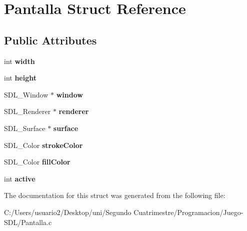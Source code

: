 \hypertarget{struct_pantalla}{}\section{Pantalla Struct Reference}
\label{struct_pantalla}
\subsection*{Public Attributes}
\begin{DoxyCompactItemize}
\item 
int {\bfseries width}\hypertarget{struct_pantalla_a0e9fa97feaefd883cbd532f737d9554e}{}\label{struct_pantalla_a0e9fa97feaefd883cbd532f737d9554e}

\item 
int {\bfseries height}\hypertarget{struct_pantalla_ae15fda85fd6288ea074a7a1b300fd58a}{}\label{struct_pantalla_ae15fda85fd6288ea074a7a1b300fd58a}

\item 
S\+D\+L\+\_\+\+Window $\ast$ {\bfseries window}\hypertarget{struct_pantalla_a8dec9e2d342435a93855aeb511ccd862}{}\label{struct_pantalla_a8dec9e2d342435a93855aeb511ccd862}

\item 
S\+D\+L\+\_\+\+Renderer $\ast$ {\bfseries renderer}\hypertarget{struct_pantalla_aef7ea33823f4c47b5375139c124a8029}{}\label{struct_pantalla_aef7ea33823f4c47b5375139c124a8029}

\item 
S\+D\+L\+\_\+\+Surface $\ast$ {\bfseries surface}\hypertarget{struct_pantalla_a285cfe423fdb8f711ff813b909e0e52e}{}\label{struct_pantalla_a285cfe423fdb8f711ff813b909e0e52e}

\item 
S\+D\+L\+\_\+\+Color {\bfseries stroke\+Color}\hypertarget{struct_pantalla_abd2fd66b3aba1f8ade0bc7f132b63038}{}\label{struct_pantalla_abd2fd66b3aba1f8ade0bc7f132b63038}

\item 
S\+D\+L\+\_\+\+Color {\bfseries fill\+Color}\hypertarget{struct_pantalla_ab15d952c42d74e338c2ca5ee6ff318c6}{}\label{struct_pantalla_ab15d952c42d74e338c2ca5ee6ff318c6}

\item 
int {\bfseries active}\hypertarget{struct_pantalla_ad8de13a81c87bec0924e85e6ab14fac2}{}\label{struct_pantalla_ad8de13a81c87bec0924e85e6ab14fac2}

\end{DoxyCompactItemize}


The documentation for this struct was generated from the following file\+:\begin{DoxyCompactItemize}
\item 
C\+:/\+Users/usuario2/\+Desktop/uni/\+Segundo Cuatrimestre/\+Programacion/\+Juego-\/\+S\+D\+L/Pantalla.\+c\end{DoxyCompactItemize}
